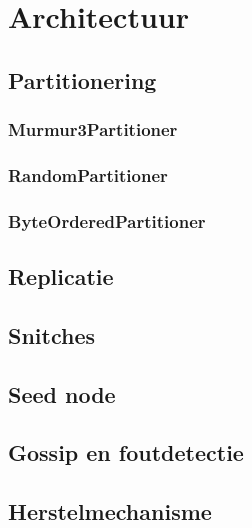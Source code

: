 \chapter{Architectuur}
\label{ch:cassandra_architectuur}

\section{Partitionering}
\subsection{Murmur3Partitioner}
\subsection{RandomPartitioner}
\subsection{ByteOrderedPartitioner}
\section{Replicatie}
\section{Snitches}
\section{Seed node}
\section{Gossip en foutdetectie}
\section{Herstelmechanisme}
